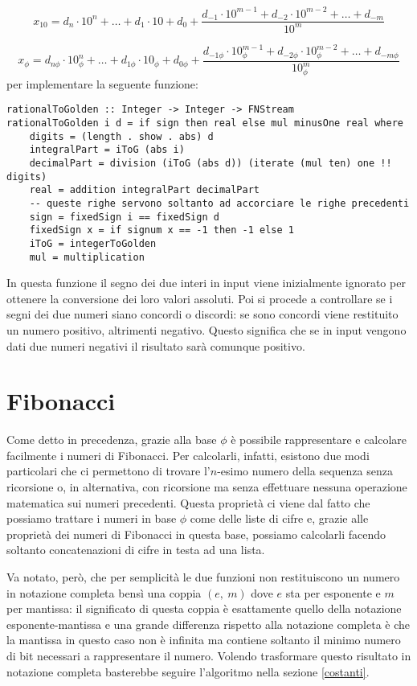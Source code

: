\documentclass[Lau,oneside]{sapthesis}
\begin{document}
$$x_{10} = d_n \cdot 10^n + \ldots + d_1 \cdot 10 + d_0 + \frac{d_{-1} \cdot 10^{m-1} + d_{-2} \cdot 10^{m-2} + \ldots + d_{-m}}{10^m}$$

$$x_\phi = d_{n\phi} \cdot 10_\phi^n + \ldots + d_{1\phi} \cdot 10_\phi + d_{0\phi} + \frac{d_{-1\phi} \cdot 10_\phi^{m-1} + d_{-2\phi} \cdot 10_\phi^{m-2} + \ldots + d_{-m\phi}}{10_\phi^m}$$
per implementare la seguente funzione:
\begin{verbatim}
rationalToGolden :: Integer -> Integer -> FNStream
rationalToGolden i d = if sign then real else mul minusOne real where
    digits = (length . show . abs) d
    integralPart = iToG (abs i)
    decimalPart = division (iToG (abs d)) (iterate (mul ten) one !! digits)
    real = addition integralPart decimalPart
    -- queste righe servono soltanto ad accorciare le righe precedenti
    sign = fixedSign i == fixedSign d
    fixedSign x = if signum x == -1 then -1 else 1
    iToG = integerToGolden
    mul = multiplication
\end{verbatim}
In questa funzione il segno dei due interi in input viene inizialmente ignorato per ottenere la conversione dei loro valori assoluti. Poi si procede a controllare se i segni dei due numeri siano concordi o discordi: se sono concordi viene restituito un numero positivo, altrimenti negativo. Questo significa che se in input vengono dati due numeri negativi il risultato sarà comunque positivo.


\section{Fibonacci}
Come detto in precedenza, grazie alla base $\phi$ è possibile rappresentare e calcolare facilmente i numeri di Fibonacci. Per calcolarli, infatti, esistono due modi particolari che ci permettono di trovare l'$n$-esimo numero della sequenza senza ricorsione o, in alternativa, con ricorsione ma senza effettuare nessuna operazione matematica sui numeri precedenti. Questa proprietà ci viene dal fatto che possiamo trattare i numeri in base $\phi$ come delle liste di cifre e, grazie alle proprietà dei numeri di Fibonacci in questa base, possiamo calcolarli facendo soltanto concatenazioni di cifre in testa ad una lista.

Va notato, però, che per semplicità le due funzioni non restituiscono un numero in notazione completa bensì una coppia $(e, \ m)$ dove $e$ sta per esponente e $m$ per mantissa: il significato di questa coppia è esattamente quello della notazione esponente-mantissa e una grande differenza rispetto alla notazione completa è che la mantissa in questo caso non è infinita ma contiene soltanto il minimo numero di bit necessari a rappresentare il numero. Volendo trasformare questo risultato in notazione completa basterebbe seguire l'algoritmo nella sezione \ref{costanti}.
\end{document}

